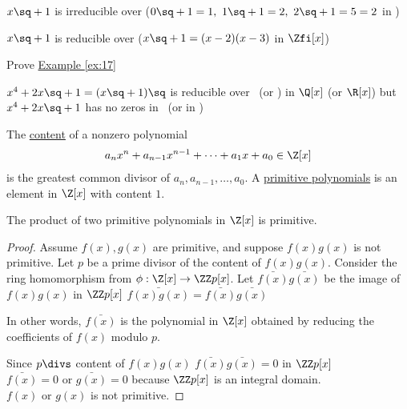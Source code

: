 \documentclass[a4paper]{article}
\begin{document}
\begin{example} \label{ex:17}
  \( x\sq + 1 \) is irreducible over \Zth \qpmi (\( 0\sq+1=1,\ 1\sq+1 = 2,\ 2\sq + 1 = 5 = 2 \) in \Zth)

  \( x\sq + 1 \) is reducible over \Zfi \qpmi (\( x\sq+1 = (x-2)(x-3) \) in \( \Zfi[x] \))
\end{example}

\begin{exercise}
  Prove \hyperref[ex:17]{Example \ref*{ex:17}}
\end{exercise}
\begin{example}
  \( x^4+2x\sq + 1 = (x\sq + 1)\sq \) is reducible over \Q\ (or \R) in \( \Q[x] \) (or \( \R[x] \)) but \( x^4+2x\sq + 1 \) has no zeros in \Q\ (or in \R)
\end{example}

\begin{definition}
The \ul{content} of a nonzero polynomial \begin{align*}
  a_nx^n + a_{n-1}x^{n-1} + \cdots + a_1x+a_0 \in \Z[x]
\end{align*} is the greatest common divisor of \( a_n, a_{n-1}, \ldots, a_0 \).
A \ul{primitive polynomials} is an element in \( \Z[x] \) with content \( 1 \).
\end{definition}

\begin{lemma}
  The product of two primitive polynomials in \( \Z[x] \) is primitive.
\end{lemma}

\begin{proof}
  Assume \( f(x),g(x) \) are primitive, and suppose \( f(x)g(x) \) is not primitive.
  Let \( p \) be a prime divisor of the content of \( f(x)g(x) \).
  Consider the ring homomorphism from \( \phi:\Z[x]\to \ZZ p[x] \).
  Let \( \bar{f(x)} \bar{g(x)} \) be the image of \( f(x)g(x)  \) in \( \ZZ p[x] \) \imp \( \bar{f(x)g(x)} = \bar{f(x)}\bar{g(x)} \)
  \begin{note}
    In other words, \( \bar{f(x)} \) is the polynomial in \( \Z[x] \) obtained by reducing the coefficients of \( f(x) \) modulo \( p \).
  \end{note}
  Since \( p\divs\) content of \( f(x)g(x) \) \imp \( \bar{f(x)}\bar{g(x)}=0 \) in \( \ZZ p[x] \)\\
  \imp \( \bar{f(x)} = 0 \) or \( \bar{g(x)} = 0 \) because \( \ZZ p[x] \) is an integral domain. \\
  \imp \( f(x) \) or \( g(x) \) is not primitive. \contradiction
\end{proof}
\end{document}
